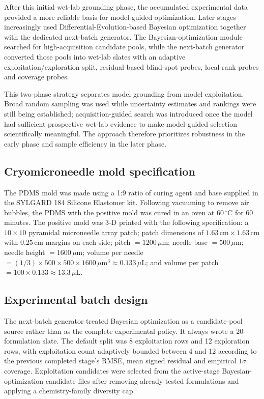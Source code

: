 \documentclass[preprint,12pt]{elsarticle}
\begin{document}
After this initial wet-lab grounding phase, the accumulated experimental data provided a more reliable basis for model-guided optimization. Later stages increasingly used Differential-Evolution-based Bayesian optimization together with the dedicated next-batch generator. The Bayesian-optimization module searched for high-acquisition candidate pools, while the next-batch generator converted those pools into wet-lab slates with an adaptive exploitation/exploration split, residual-based blind-spot probes, local-rank probes and coverage probes.

This two-phase strategy separates model grounding from model exploitation. Broad random sampling was used while uncertainty estimates and rankings were still being established; acquisition-guided search was introduced once the model had sufficient prospective wet-lab evidence to make model-guided selection scientifically meaningful. The approach therefore prioritizes robustness in the early phase and sample efficiency in the later phase.

\subsection{Cryomicroneedle mold specification}

The PDMS mold was made using a 1:9 ratio of curing agent and base supplied in the SYLGARD 184 Silicone Elastomer kit. Following vacuuming to remove air bubbles, the PDMS with the positive mold was cured in an oven at \(60\,^{\circ}\mathrm{C}\) for 60 minutes. The positive mold was 3-D printed with the following specification: a \(10\times10\) pyramidal microneedle array patch; patch dimensions of \(1.63\,\mathrm{cm}\times1.63\,\mathrm{cm}\) with \(0.25\,\mathrm{cm}\) margins on each side; pitch \(=1200\,\mu\mathrm{m}\); needle base \(=500\,\mu\mathrm{m}\); needle height \(=1600\,\mu\mathrm{m}\); volume per needle \(=(1/3)\times500\times500\times1600\,\mu\mathrm{m}^{3}\approx0.133\,\mu\mathrm{L}\); and volume per patch \(=100\times0.133\approx13.3\,\mu\mathrm{L}\).

\subsection{Experimental batch design}

The next-batch generator treated Bayesian optimization as a candidate-pool source rather than as the complete experimental policy. It always wrote a 20-formulation slate. The default split was 8 exploitation rows and 12 exploration rows, with exploitation count adaptively bounded between 4 and 12 according to the previous completed stage's RMSE, mean signed residual and empirical \(1\sigma\) coverage. Exploitation candidates were selected from the active-stage Bayesian-optimization candidate files after removing already tested formulations and applying a chemistry-family diversity cap.
\end{document}
